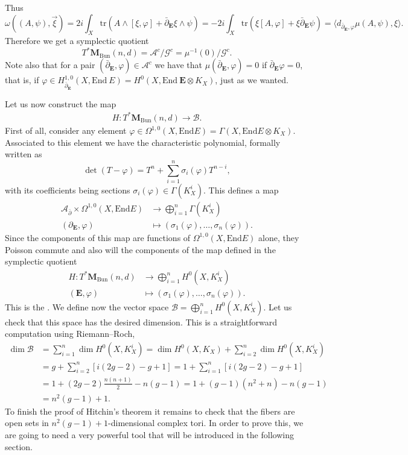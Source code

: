 \documentclass[12pt,a4paper]{book}
\theoremstyle{definition} \newtheorem{defn}[thm]{Definition}
\theoremstyle{definition} \newtheorem{ejemplo}[thm]{Example}
\theoremstyle{remark} \newtheorem{rem}[thm]{Remark}
\def\AA{\mathscr{A}}
\def\BB{\mathscr{B}}
\def\GG{\mathscr{G}}
\def\tr{\mathrm{tr}}
\def\End{\mathrm{End}}
\def\Bun{\mathbf{M}_{\mathrm{Bun}}}
\def\delbar{\bar{\partial}}
\newcommand{\ve}[1]{\mathbf{#1}}
\let\emph\relax
\begin{document}
  Thus
  \begin{equation*}
    \omega\left( (A,\psi),\vec{\xi} \right)=2i\int_X \tr(A\wedge[\xi,\varphi] + \delbar_{\ve{E}} \xi \wedge \psi)=- 2i\int_X \tr(\xi[A,\varphi] + \xi \delbar_{\ve{E}} \psi)=\langle d_{\delbar_{\ve{E}},\varphi}\mu(A,\psi),\xi \rangle.
  \end{equation*}
  Therefore we get a symplectic quotient $$T^*\Bun(n,d)=\AA^{c}/\GG^c=\mu^{-1}(0)/\GG^c.$$   Note also that for a pair $(\delbar_{\ve{E}},\varphi)\in \AA^c$ we have that $\mu(\delbar_{\ve{E}},\varphi)=0$ if $\delbar_{\ve{E}} \varphi=0$, that is, if $\varphi\in H_{\delbar_{\ve{E}}}^{1,0}(X, \End\ E)=H^0(X,\End\ \ve{E} \otimes K_X)$, just as we wanted.

  Let us now construct the map 
  \begin{align*}
    H :T^*\Bun(n,d)\rightarrow \BB.
    \end{align*}
    First of all, consider any element $\varphi \in \Omega^{1,0}(X,\End E)=\Gamma(X,\End E \otimes K_X)$. Associated to this element we have the characteristic polynomial, formally written as
    \begin{equation*}
      \det(T-\varphi)=T^n + \sum_{i=1}^{n} \sigma_i(\varphi) T^{n-i},
    \end{equation*}
    with its coefficients being sections $\sigma_i(\varphi) \in \Gamma(K_X^i)$. This defines a map
    \begin{align*}
      \AA_{\delbar} \times \Omega^{1,0}(X,\End E)&\longrightarrow \bigoplus_{i=1}^n \Gamma(K_X^i)\\ 
      (\partial_{\ve{E}},\varphi) &\longmapsto (\sigma_1(\varphi),\dots,\sigma_n(\varphi)). 
      \end{align*}
      Since the components of this map are functions of $\Omega^{1,0}(X,\End E)$ alone, they Poisson commute and also will the components of the map defined in the symplectic quotient
      \begin{align*}
	H :T^*\Bun(n,d)&\longrightarrow \bigoplus_{i=1}^n H^0(X,K^i_X)\\ 
	(\ve{E},\varphi) &\longmapsto (\sigma_1(\varphi),\dots,\sigma_n(\varphi)). 
	\end{align*}
	This is the \emph{Hitchin map}. We define now the vector space $\BB= \bigoplus_{i=1}^n H^0(X,K^i_X)$. Let us check that this space has the desired dimension. This is a straightforward computation using Riemann--Roch,
	\begin{align*}
      \dim \BB &= \sum_{i=1}^n \dim H^0(X,K_X^i)= \dim H^0(X,K_X) + \sum_{i=2}^n \dim H^0(X,K_X^i)\\
      &= g + \sum_{i=2}^n [i(2g-2)-g+1] =1+ \sum_{i=1}^n [i(2g-2)-g+1] \\
      &= 1+ (2g-2)\frac{n(n+1)}{2} - n(g-1) = 1+(g-1)(n^2+n) - n(g-1) \\
      &= n^2(g-1)+1.
    \end{align*}
    To finish the proof of Hitchin's theorem it remains to check that the fibers are open sets in $n^2(g-1)+1$-dimensional complex tori. In order to prove this, we are going to need a very powerful tool that will be introduced in the following section.
\end{document}
